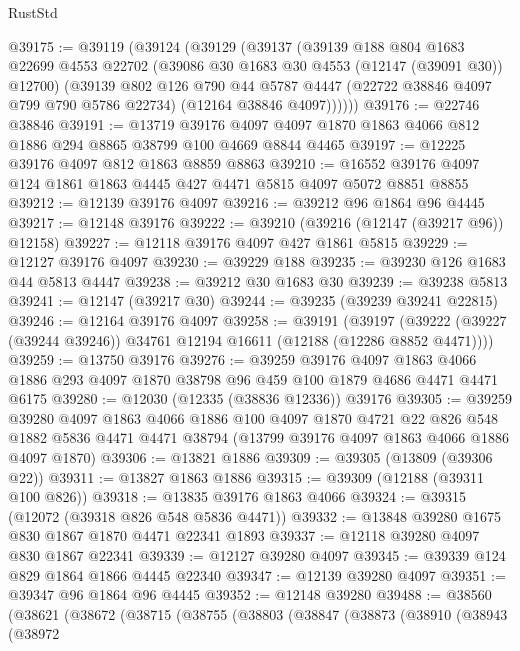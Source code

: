 \begin{lexlean}{RustStd}
\begin{coremodule}
@39175 := @39119
    (@39124
      (@39129
        (@39137
          (@39139
            @188
            @804
            @1683
            @22699
            @4553
            @22702
            (@39086 @30 @1683 @30 @4553 (@12147 (@39091 @30)) @12700)
            (@39139
              @802
              @126
              @790
              @44
              @5787
              @4447
              (@22722 @38846 @4097 @799 @790 @5786 @22734)
              (@12164 @38846 @4097))))))
@39176 := @22746 @38846
@39191 := @13719
    @39176
    @4097
    @4097
    @1870
    @1863
    @4066
    @812
    @1886
    @294
    @8865
    @38799
    @100
    @4669
    @8844
    @4465
@39197 := @12225 @39176 @4097 @812 @1863 @8859 @8863
@39210 := @16552 @39176 @4097 @124 @1861 @1863 @4445 @427 @4471 @5815 @4097 @5072 @8851 @8855
@39212 := @12139 @39176 @4097
@39216 := @39212 @96 @1864 @96 @4445
@39217 := @12148 @39176
@39222 := @39210 (@39216 (@12147 (@39217 @96)) @12158)
@39227 := @12118 @39176 @4097 @427 @1861 @5815
@39229 := @12127 @39176 @4097
@39230 := @39229 @188
@39235 := @39230 @126 @1683 @44 @5813 @4447
@39238 := @39212 @30 @1683 @30
@39239 := @39238 @5813
@39241 := @12147 (@39217 @30)
@39244 := @39235 (@39239 @39241 @22815)
@39246 := @12164 @39176 @4097
@39258 := @39191
    (@39197 (@39222 (@39227 (@39244 @39246)) @34761 @12194 @16611 (@12188 (@12286 @8852 @4471))))
@39259 := @13750 @39176
@39276 := @39259
    @39176
    @4097
    @1863
    @4066
    @1886
    @293
    @4097
    @1870
    @38798
    @96
    @459
    @100
    @1879
    @4686
    @4471
    @4471
    @6175
@39280 := @12030 (@12335 (@38836 @12336)) @39176
@39305 := @39259
    @39280
    @4097
    @1863
    @4066
    @1886
    @100
    @4097
    @1870
    @4721
    @22
    @826
    @548
    @1882
    @5836
    @4471
    @4471
    @38794
    (@13799 @39176 @4097 @1863 @4066 @1886 @4097 @1870)
@39306 := @13821 @1886
@39309 := @39305 (@13809 (@39306 @22))
@39311 := @13827 @1863 @1886
@39315 := @39309 (@12188 (@39311 @100 @826))
@39318 := @13835 @39176 @1863 @4066
@39324 := @39315 (@12072 (@39318 @826 @548 @5836 @4471))
@39332 := @13848 @39280 @1675 @830 @1867 @1870 @4471 @22341 @1893
@39337 := @12118 @39280 @4097 @830 @1867 @22341
@39339 := @12127 @39280 @4097
@39345 := @39339 @124 @829 @1864 @1866 @4445 @22340
@39347 := @12139 @39280 @4097
@39351 := @39347 @96 @1864 @96 @4445
@39352 := @12148 @39280
@39488 := @38560
    (@38621
      (@38672
        (@38715
          (@38755
            (@38803
              (@38847
                (@38873
                  (@38910
                    (@38943
                      (@38972

\end{coremodule}
\end{lexlean}
